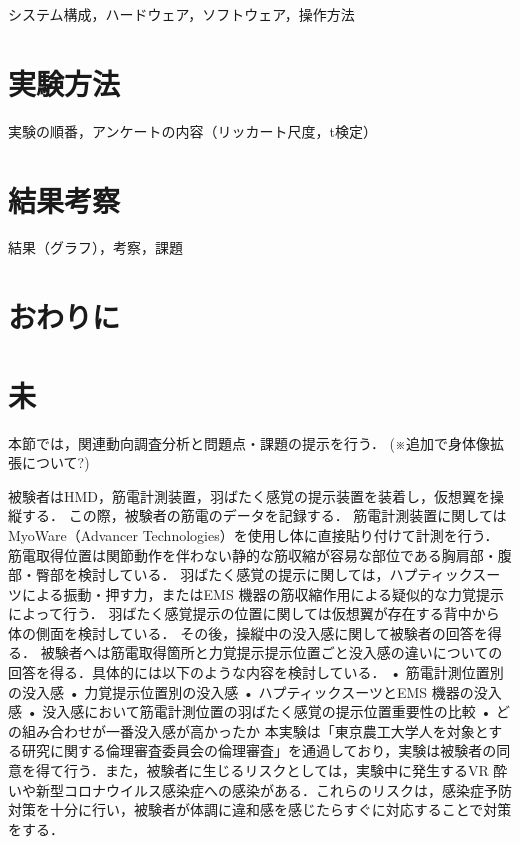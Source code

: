         



        

        システム構成，ハードウェア，ソフトウェア，操作方法

\section{実験方法}
        実験の順番，アンケートの内容（リッカート尺度，t検定）

\section{結果考察}
        結果（グラフ），考察，課題

\section{おわりに}

\section{未}

        本節では，関連動向調査分析と問題点・課題の提示を行う．
        (※追加で身体像拡張について?)



        被験者はHMD，筋電計測装置，羽ばたく感覚の提示装置を装着し，仮想翼を操縦する．
この際，被験者の筋電のデータを記録する．
筋電計測装置に関してはMyoWare（Advancer Technologies）を使用し体に直接貼り付けて計測を行う．
筋電取得位置は関節動作を伴わない静的な筋収縮が容易な部位である胸肩部・腹部・臀部を検討している．
羽ばたく感覚の提示に関しては，ハプティックスーツによる振動・押す力，またはEMS 機器の筋収縮作用による疑似的な力覚提示によって行う．
羽ばたく感覚提示の位置に関しては仮想翼が存在する背中から体の側面を検討している．
その後，操縦中の没入感に関して被験者の回答を得る．
被験者へは筋電取得箇所と力覚提示提示位置ごと没入感の違いについての回答を得る．具体的には以下のような内容を検討している．
• 筋電計測位置別の没入感
• 力覚提示位置別の没入感
• ハプティックスーツとEMS 機器の没入感
• 没入感において筋電計測位置の羽ばたく感覚の提示位置重要性の比較
• どの組み合わせが一番没入感が高かったか
本実験は「東京農工大学人を対象とする研究に関する倫理審査委員会の倫理審査」を通過しており，実験は被験者の同意を得て行う．また，被験者に生じるリスクとしては，実験中に発生するVR 酔いや新型コロナウイルス感染症への感染がある．これらのリスクは，感染症予防対策を十分に行い，被験者が体調に違和感を感じたらすぐに対応することで対策をする．

